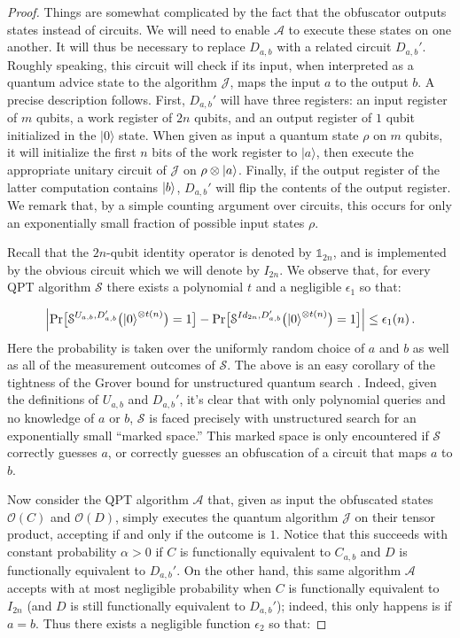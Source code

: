 \documentclass[envcountsame]{llncs}
\numberwithin{equation}{section}
\newcommand{\one}{\mathds 1}
\newcommand{\algo}{\mathcal}
\begin{document}
\begin{proof}
Things are somewhat complicated by the fact that the obfuscator outputs states instead of circuits. We will need to enable $\algo A$ to execute these states on one another. It will thus be necessary to replace $D_{a, b}$ with a related circuit $D_{a, b}'$. Roughly speaking, this circuit will check if its input, when interpreted as a quantum advice state to the algorithm $\algo J$, maps the input $a$ to the output $b$. A precise description follows. First, $D_{a, b}'$ will have three registers: an input register of $m$ qubits, a work register of $2n$ qubits, and an output register of $1$ qubit initialized in the $|0\rangle$ state. When given as input a quantum state $\rho$ on $m$ qubits, it will initialize the first $n$ bits of the work register to $|a\rangle$, then execute the appropriate unitary circuit of $\algo J$ on $\rho \otimes {\left\vert{a}\right\rangle}$. Finally, if the output register of the latter computation contains ${\left\vert{b}\right\rangle}$, $D_{a, b}'$ will flip the contents of the output register. We remark that, by a simple counting argument over circuits, this occurs for only an exponentially small fraction of possible input states $\rho$.

Recall that the $2n$-qubit identity operator is denoted by $\one_{2n}$, and is implemented by the obvious circuit which we will denote by $I_{2n}$. We observe that, for every QPT algorithm $\mathcal S$ there exists a polynomial $t$ and a negligible $\epsilon_1$ so that:

\begin{equation}\label{eqn11}
\Bigl| \text{Pr}\bigl[\mathcal S^{U_{a,b}, D_{a,b}'}\bigl({\left\vert{0}\right\rangle}^{\otimes t(n)}\bigr) = 1\bigr]
- \text{Pr}\bigl[\mathcal S^{Id_{2n}, D_{a,b}'}\bigl({\left\vert{0}\right\rangle}^{\otimes t(n)}\bigr) = 1\bigr] \Bigr| 
\leq \epsilon_1(n)\,.
\end{equation}
Here the probability is taken over the uniformly random choice of $a$ and $b$ as well as all of the measurement outcomes of $\algo S$. The above is an easy corollary of the tightness of the Grover bound for unstructured quantum search \cite{BBBV}. Indeed, given the definitions of $U_{a, b}$ and $D_{a, b}'$, it's clear that with only polynomial queries and no knowledge of $a$ or $b$, $\algo S$ is faced precisely with unstructured search for an exponentially small ``marked space.'' This marked space is only encountered if $\algo S$ correctly guesses $a$, or correctly guesses an obfuscation of a circuit that maps $a$ to $b$.
  
Now consider the QPT algorithm $\mathcal{A}$ that, given as input the obfuscated states $\mathcal{O}(C)$ and $\mathcal{O}(D)$, simply executes the quantum algorithm $\mathcal{J}$ on their tensor product, accepting if and only if the outcome is $1$. Notice that this succeeds with constant probability $\alpha > 0$ if $C$ is functionally equivalent to $C_{a,b}$ and $D$ is functionally equivalent to $D_{a,b}'$. On the other hand, this same algorithm $\algo A$ accepts with at most negligible probability when $C$ is functionally equivalent to $I_{2n}$ (and $D$ is still functionally equivalent to $D_{a, b}'$); indeed, this only happens is if $a = b$. Thus there exists a negligible function $\epsilon_2$ so that:


\end{proof}
\end{document}
